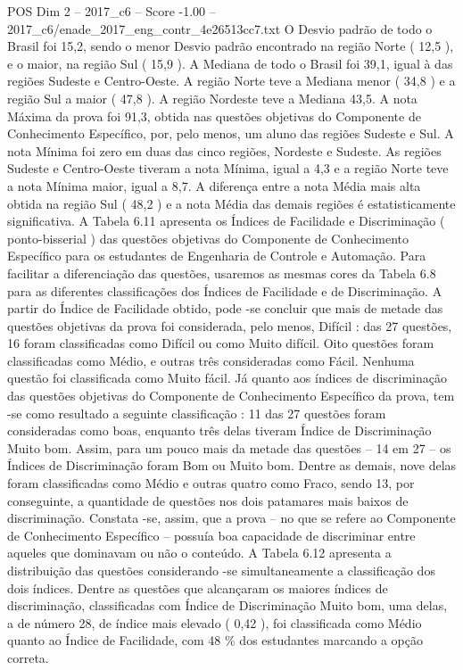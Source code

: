 \begin{textsample}{POS Dim 2 – 2017\_c6 – Score -1.00 – 2017\_c6/enade\_2017\_eng\_contr\_4e26513cc7.txt}
O Desvio padrão de todo o Brasil foi 15,2, sendo o menor Desvio padrão encontrado na região Norte ( 12,5 ), e o maior, na região Sul ( 15,9 ).
A Mediana de todo o Brasil foi 39,1, igual à das regiões Sudeste e Centro-Oeste.
A região Norte teve a Mediana menor ( 34,8 ) e a região Sul a maior ( 47,8 ).
A região Nordeste teve a Mediana 43,5.
A nota Máxima da prova foi 91,3, obtida nas questões objetivas do Componente de Conhecimento Específico, por, pelo menos, um aluno das regiões Sudeste e Sul.
A nota Mínima foi zero em duas das cinco regiões, Nordeste e Sudeste.
As regiões Sudeste e Centro-Oeste tiveram a nota Mínima, igual a 4,3 e a região Norte teve a nota Mínima maior, igual a 8,7.
A diferença entre a nota Média mais alta obtida na região Sul ( 48,2 ) e a nota Média das demais regiões é estatisticamente significativa.
A Tabela 6.11 apresenta os Índices de Facilidade e Discriminação ( ponto-bisserial ) das questões objetivas do Componente de Conhecimento Específico para os estudantes de Engenharia de Controle e Automação.
Para facilitar a diferenciação das questões, usaremos as mesmas cores da Tabela 6.8 para as diferentes classificações dos Índices de Facilidade e de Discriminação.
A partir do Índice de Facilidade obtido, pode -se concluir que mais de metade das questões objetivas da prova foi considerada, pelo menos, Difícil : das 27 questões, 16 foram classificadas como Difícil ou como Muito difícil.
Oito questões foram classificadas como Médio, e outras três consideradas como Fácil.
Nenhuma questão foi classificada como Muito fácil.
Já quanto aos índices de discriminação das questões objetivas do Componente de Conhecimento Específico da prova, tem -se como resultado a seguinte classificação : 11 das 27 questões foram consideradas como boas, enquanto três delas tiveram Índice de Discriminação Muito bom.
Assim, para um pouco mais da metade das questões – 14 em 27 – os Índices de Discriminação foram Bom ou Muito bom.
Dentre as demais, nove delas foram classificadas como Médio e outras quatro como Fraco, sendo 13, por conseguinte, a quantidade de questões nos dois patamares mais baixos de discriminação.
Constata -se, assim, que a prova – no que se refere ao Componente de Conhecimento Específico – possuía boa capacidade de discriminar entre aqueles que dominavam ou não o conteúdo.
A Tabela 6.12 apresenta a distribuição das questões considerando -se simultaneamente a classificação dos dois índices.
Dentre as questões que alcançaram os maiores índices de discriminação, classificadas com Índice de Discriminação Muito bom, uma delas, a de número 28, de índice mais elevado ( 0,42 ), foi classificada como Médio quanto ao Índice de Facilidade, com 48 \% dos estudantes marcando a opção correta.

\end{textsample}
